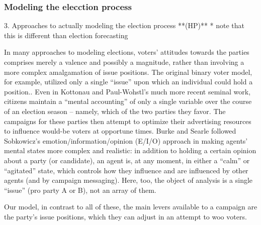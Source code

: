 \subsubsection{Modeling the elecction process}
    3. Approaches to actually modeling the election process **(HP)**
        * note that this is different than election forecasting




In many approaches to modeling elections, voters' attitudes towards the parties
comprises merely a valence and possibly a magnitude, rather than involving a
more complex amalgamation of issue positions. The original binary voter model,
for example, utilized only a single ``issue'' upon which an individual could
hold a position.\cite{holley_ergodic_1975,clifford_model_1973}. Even in
Kottonau and Paul-Wohstl's much more recent seminal
work\cite{kottonau_simulating_2004}, citizens maintain a ``mental accounting''
of only a single variable over the course of an election season -- namely,
which of the two parties they favor. The campaigns for these parties then
attempt to optimize their advertising resources to influence would-be voters at
opportune times. Burke and Searle\cite{burke_quantitatively_2022} followed
Sobkowicz's emotion/information/opinion (E/I/O)
approach\cite{sobkowicz_quantitative_2016} in making agents' mental states more
complex and realistic: in addition to holding a certain opinion about a party
(or candidate), an agent is, at any moment, in either a ``calm'' or
``agitated'' state, which controls how they influence and are influenced by
other agents (and by campaign messaging). Here, too, the object of analysis is
a single ``issue'' (pro party A or B), not an array of them.

Our model, in contrast to all of these, the main levers available to a campaign
are the party's issue positions, which they can adjust in an attempt to woo
voters.




